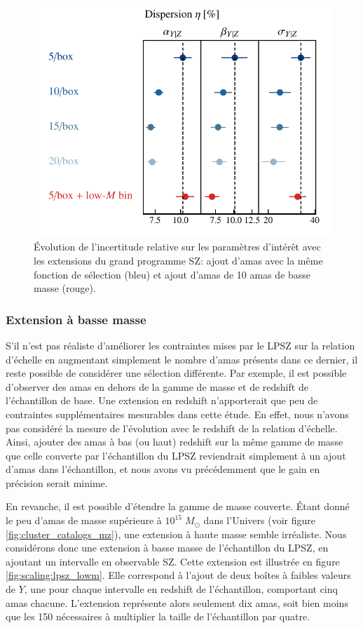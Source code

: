 \begin{figure}[t]
    \centering
    \includegraphics[width=.6\linewidth]{Figures/Chap_scaling/eta_ext.pdf}
    \caption{
        Évolution de l'incertitude relative sur les paramètres d'intérêt avec les extensions du grand programme SZ: ajout d'amas avec la même fonction de sélection (bleu) et ajout d'amas de 10 amas de basse masse (rouge).
    }
    \label{fig:scaling:eta_ext}
\end{figure}

\subsubsection{Extension à basse masse} %

S'il n'est pas réaliste d'améliorer les contraintes mises par le LPSZ sur la relation d'échelle en augmentant simplement le nombre d'amas présents dans ce dernier, il reste possible de considérer une sélection différente.
Par exemple, il est possible d'observer des amas en dehors de la gamme de masse et de redshift de l'échantillon de base.
Une extension en redshift n'apporterait que peu de contraintes supplémentaires mesurables dans cette étude.
En effet, nous n'avons pas considéré la mesure de l'évolution avec le redshift de la relation d'échelle.
Ainsi, ajouter des amas à bas (ou haut) redshift sur la même gamme de masse que celle couverte par l'échantillon du LPSZ reviendrait simplement à un ajout d'amas dans l'échantillon, et nous avons vu précédemment que le gain en précision serait minime.

En revanche, il est possible d'étendre la gamme de masse couverte.
Étant donné le peu d'amas de masse supérieure à $10^{15} \; M_\odot$ dans l'Univers (voir figure \ref{fig:cluster_catalogs_mz}), une extension à haute masse semble irréaliste.
Nous considérons donc une extension à basse masse de l'échantillon du LPSZ, en ajoutant un intervalle en observable SZ.
Cette extension est illustrée en figure \ref{fig:scaling:lpsz_lowm}.
Elle correspond à l'ajout de deux boîtes à faibles valeurs de $Y$, une pour chaque intervalle en redshift de l'échantillon, comportant cinq amas chacune.
L'extension représente alors seulement dix amas, soit bien moins que les 150 nécessaires à multiplier la taille de l'échantillon par quatre.

